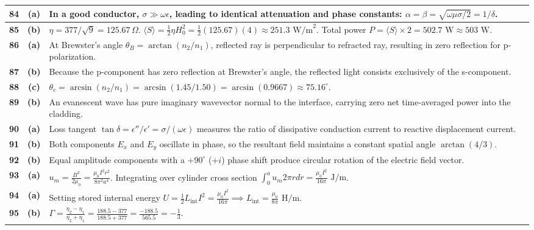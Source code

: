 {\begin{tabularx}{\textwidth}{|c|c|X|}
\textbf{84} & \textbf{(a)} & In a good conductor, $\sigma \gg \omega\epsilon$, leading to identical attenuation and phase constants: $\alpha = \beta = \sqrt{\omega\mu\sigma/2} = 1/\delta$. \\ \hline
\textbf{85} & \textbf{(b)} & $\eta = 377/\sqrt{9} = 125.67\,\Omega$. $\langle S \rangle = \frac{1}{2}\eta H_0^2 = \frac{1}{2}(125.67)(4) \approx 251.3\text{ W/m}^2$. Total power $P = \langle S \rangle \times 2 = 502.7\text{ W} \approx 503\text{ W}$. \\ \hline
\textbf{86} & \textbf{(a)} & At Brewster's angle $\theta_B = \arctan(n_2/n_1)$, reflected ray is perpendicular to refracted ray, resulting in zero reflection for p-polarization. \\ \hline
\textbf{87} & \textbf{(b)} & Because the p-component has zero reflection at Brewster's angle, the reflected light consists exclusively of the s-component. \\ \hline
\textbf{88} & \textbf{(c)} & $\theta_c = \arcsin(n_2/n_1) = \arcsin(1.45/1.50) = \arcsin(0.9667) \approx 75.16^\circ$. \\ \hline
\textbf{89} & \textbf{(b)} & An evanescent wave has pure imaginary wavevector normal to the interface, carrying zero net time-averaged power into the cladding. \\ \hline
\textbf{90} & \textbf{(a)} & Loss tangent $\tan\delta = \epsilon''/\epsilon' = \sigma/(\omega\epsilon)$ measures the ratio of dissipative conduction current to reactive displacement current. \\ \hline
\textbf{91} & \textbf{(b)} & Both components $E_x$ and $E_y$ oscillate in phase, so the resultant field maintains a constant spatial angle $\arctan(4/3)$. \\ \hline
\textbf{92} & \textbf{(b)} & Equal amplitude components with a $+90^\circ$ ($+i$) phase shift produce circular rotation of the electric field vector. \\ \hline
\textbf{93} & \textbf{(a)} & $u_m = \frac{B^2}{2\mu_0} = \frac{\mu_0 I^2 r^2}{8\pi^2 a^4}$. Integrating over cylinder cross section $\int_0^a u_m 2\pi r dr = \frac{\mu_0 I^2}{16\pi}\text{ J/m}$. \\ \hline
\textbf{94} & \textbf{(a)} & Setting stored internal energy $U = \frac{1}{2} L_{\text{int}} I^2 = \frac{\mu_0 I^2}{16\pi} \implies L_{\text{int}} = \frac{\mu_0}{8\pi}\text{ H/m}$. \\ \hline
\textbf{95} & \textbf{(b)} & $\Gamma = \frac{\eta_2 - \eta_1}{\eta_2 + \eta_1} = \frac{188.5 - 377}{188.5 + 377} = \frac{-188.5}{565.5} = -\frac{1}{3}$. \\ \hline

\end{tabularx}}

